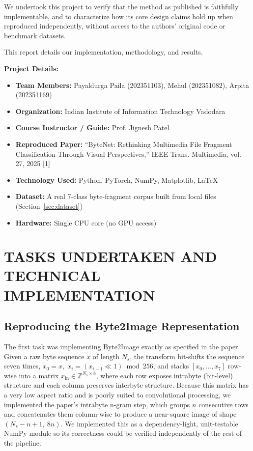 \documentclass[conference]{IEEEtran}
\begin{document}
{We undertook this project to verify that the method as published is faithfully implementable, and to characterize how its core design claims hold up when reproduced independently, without access to the authors' original code or benchmark datasets.

This report details our implementation, methodology, and results.

\textbf{Project Details:}
\begin{itemize}[leftmargin=1em, itemsep=0pt]
\item \textbf{Team Members:} Payaldurga Paila (202351103), Mehul (202351082), Arpita (202351169)
\item \textbf{Organization:} Indian Institute of Information Technology Vadodara
\item \textbf{Course Instructor / Guide:} Prof. Jignesh Patel
\item \textbf{Reproduced Paper:} ``ByteNet: Rethinking Multimedia File Fragment Classification Through Visual Perspectives,'' IEEE Trans. Multimedia, vol. 27, 2025 [1]
\item \textbf{Technology Used:} Python, PyTorch, NumPy, Matplotlib, \LaTeX
\item \textbf{Dataset:} A real 7-class byte-fragment corpus built from local files (Section~\ref{sec:dataset})
\item \textbf{Hardware:} Single CPU core (no GPU access)
\end{itemize}

\section{TASKS UNDERTAKEN AND TECHNICAL IMPLEMENTATION}

\subsection{Reproducing the Byte2Image Representation}
The first task was implementing Byte2Image exactly as specified in the paper. Given a raw byte sequence $x$ of length $N_s$, the transform bit-shifts the sequence seven times, $x_0 = x,\; x_i = (x_{i-1} \ll 1) \bmod 256$, and stacks $[x_0, \ldots, x_7]$ row-wise into a matrix $x_{\text{in}} \in \mathbb{Z}^{N_s \times 8}$, where each row exposes intrabyte (bit-level) structure and each column preserves interbyte structure. Because this matrix has a very low aspect ratio and is poorly suited to convolutional processing, we implemented the paper's intrabyte n-gram step, which groups $n$ consecutive rows and concatenates them column-wise to produce a near-square image of shape $(N_s - n + 1,\ 8n)$. We implemented this as a dependency-light, unit-testable NumPy module so its correctness could be verified independently of the rest of the pipeline.

}
\end{document}
